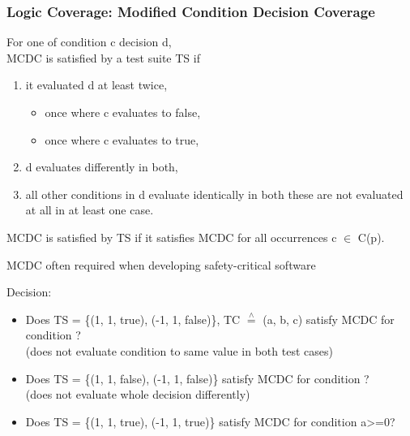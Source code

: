 \subsubsection*{Logic Coverage: Modified Condition Decision Coverage}
\begin{defBox}[title=Definition (Modified Condition-Decision Coverage (MCDC))]
    For one  of condition c  decision d,\\
    MCDC is satisfied by a test suite TS if 
    \begin{enumerate}
        \item it evaluated d at least twice,
        \begin{itemize}
            \item once where c evaluates to false,
            \item once where c evaluates to true,
        \end{itemize}
        \item d evaluates differently in both,
        \item all other conditions in d evaluate identically in both  these are not evaluated at all in at least one case.
    \end{enumerate}
    MCDC is satisfied by TS if it satisfies MCDC for all occurrences c $\in$ C(p).
\end{defBox}
\begin{defBox}
    MCDC often required when developing safety-critical software
\end{defBox}
\begin{defBox}[title=Example (MCDC)]
    Decision: 
    \begin{itemize}
        \item Does TS = \{(1, 1, true), (-1, 1, false)\}, TC $\overset{\wedge}{=}$ (a, b, c) satisfy MCDC for condition ?\\
         (does not evaluate condition  to same value in both test cases)
        \item Does TS = \{(1, 1, false), (-1, 1, false)\} satisfy MCDC for condition ?\\
         (does not evaluate whole decision differently)
        \item Does TS = \{(1, 1, true), (-1, 1, true)\} satisfy MCDC for condition a>=0?\\
    \end{itemize}
\end{defBox}
\clearpage
